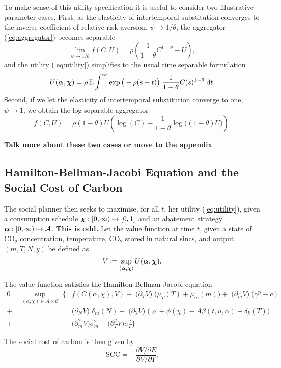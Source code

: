 \documentclass[../../main.tex]{subfiles}
\begin{document}
To make sense of this utility specification it is useful to consider two illustrative parameter cases. First, as the elasticity of intertemporal substitution converges to the inverse  coefficient of relative risk aversion, $\psi \to 1 / \theta$, the aggregator (\ref{eq:aggregator}) becomes separable \begin{equation}
    \lim_{\psi \to 1 / \theta} f(C, U) = \rho \left(\frac{1}{1 - \theta} C^{1 - \theta} - U\right),
\end{equation} and the utility (\ref{eq:utility}) simplifies to the usual time separable formulation \begin{equation}
    U(\bm{\alpha}, \bm{\chi}) = \rho\operatorname{\mathbb{E}} \int^{\infty} \exp\big(-\rho (s - t) \big) \; \frac{1}{1 - \theta} C(s)^{1 - \theta} \; \mathrm{d}t.
\end{equation} Second, if we let the elasticity of intertemporal substitution converge to one, $\psi \to 1$, we obtain the log-separable aggregator \begin{equation}
    f(C, U) = \rho (1 - \theta)U \left(\log(C) - \frac{1}{1 - \theta} \log\big( (1 - \theta) U \big) \right).
\end{equation}

\textbf{Talk more about these two cases or move to the appendix}

\subsection{Hamilton-Bellman-Jacobi Equation and the Social Cost of Carbon}

The social planner then seeks to maximise, for all $t$, her utility (\ref{eq:utility}), given a consumption schedule $\bm{\chi}: [0, \infty) \mapsto \mathcal [0, 1]$ and an abatement strategy $\bm{\alpha}: [0, \infty) \mapsto \mathcal{A}$. \textbf{This is odd.} Let the value function at time $t$, given a state of CO$_2$ concentration, temperature, CO$_2$ stored in natural sincs, and output $(m, T, N, y)$ be defined as \begin{equation}
    V \coloneqq \sup_{(\bm{\alpha}, \bm{\chi})} U(\bm{\alpha}, \bm{\chi}).
\end{equation}

\begin{proposition}
    The value function satisfies the Hamilton-Bellman-Jacobi equation \begin{equation}
        \begin{split}
            0 = \sup_{(\alpha, \chi) \in \mathcal{A} \times \mathcal{C}} \; \Bigg\{&f\left(C(\alpha, \chi), V\right) + \; \big(\partial_T V \big) \; \Big(\mu_T(T) + \mu_{m}(m) \Big) + \; \big(\partial_{m} V \big) \; \Big(\gamma^{\mathrm{p}} - \alpha \Big) \\
            + \; &\Big(\partial_{N} V\Big) \; \delta_m(N) + \; \Big(\partial_{Y} V \Big) \; \Big(\varrho + \phi(\chi) - A \beta(t, u, \alpha) - \delta_k(T) \Big) \\
            + \; &\Big(\partial^2_{m} V\Big) \sigma^2_m + \Big(\partial^2_{T} V\Big) \sigma^2_T  \Bigg\}
        \end{split}
    \end{equation}
\end{proposition}

The social cost of carbon is then given by \begin{equation}
    \text{SCC} = - \frac{\partial V / \partial E}{\partial V / \partial Y}. 
\end{equation}
\end{document}
